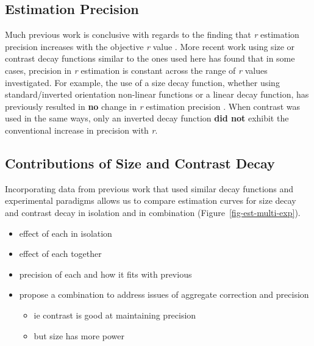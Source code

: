 \documentclass[manuscript, review, anonymous, screen]{acmart}
\providecommand{\tightlist}{%
  \setlength{\itemsep}{0pt}\setlength{\parskip}{0pt}}\usepackage{longtable,booktabs,array}
\begin{document}
\hypertarget{estimation-precision}{%
\subsection{Estimation Precision}\label{estimation-precision}}

Much previous work is conclusive with regards to the finding that
\emph{r} estimation precision increases with the objective \emph{r}
value
\citep{rensink_2010, rensink_2012, rensink_2014, rensink_2017, doherty_2007}.
More recent work using size or contrast decay functions similar to the
ones used here \citep{strain_2023, strain_2023b} has found that in some
cases, precision in \emph{r} estimation is constant across the range of
\emph{r} values investigated. For example, the use of a size decay
function, whether using standard/inverted orientation non-linear
functions or a linear decay function, has previously resulted in
\textbf{no} change in \emph{r} estimation precision
\citep{strain_2023b}. When contrast was used in the same ways, only an
inverted decay function \textbf{did not} exhibit the conventional
increase in precision with \emph{r}.

\hypertarget{contributions-of-size-and-contrast-decay}{%
\subsection{Contributions of Size and Contrast
Decay}\label{contributions-of-size-and-contrast-decay}}

Incorporating data from previous work \citep{strain_2023, strain_2023b}
that used similar decay functions and experimental paradigms allows us
to compare estimation curves for size decay and contrast decay in
isolation and in combination (Figure~\ref{fig-est-multi-exp}).

\begin{itemize}
\tightlist
\item
  effect of each in isolation
\item
  effect of each together
\item
  precision of each and how it fits with previous
\item
  propose a combination to address issues of aggregate correction and
  precision

  \begin{itemize}
  \tightlist
  \item
    ie contrast is good at maintaining precision
  \item
    but size has more power
  \end{itemize}
\end{itemize}
\end{document}
